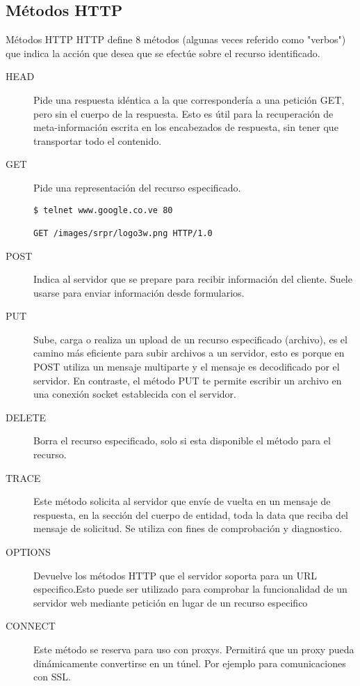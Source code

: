 \subsection{Métodos HTTP} %


\begin{frame}{Métodos HTTP} %
    HTTP define 8 métodos (algunas veces referido como "verbos") que indica la acción que desea que se efectúe sobre el recurso identificado.

    \begin{description}
        \item[HEAD] 
        Pide una respuesta idéntica a la que correspondería a una petición GET, pero sin el cuerpo de la respuesta. Esto es útil para la recuperación de meta-información escrita en los encabezados de respuesta, sin tener que transportar todo el contenido.
        \item[GET]
        Pide una representación del recurso especificado.
        \begin{verbatim}
$ telnet www.google.co.ve 80

GET /images/srpr/logo3w.png HTTP/1.0

        \end{verbatim}
        \item[POST] Indica al servidor que se prepare para recibir información del cliente. Suele usarse para enviar información desde formularios.
        \item[PUT] Sube, carga o realiza un upload de un recurso especificado (archivo), es el camino más eficiente para subir archivos a un servidor, esto es porque en POST utiliza un mensaje multiparte y el mensaje es decodificado por el servidor. En contraste, el método PUT te permite escribir un archivo en una conexión socket establecida con el servidor.
        \item[DELETE] Borra el recurso especificado, solo si esta disponible el
        método para el recurso.
        \item[TRACE] Este método solicita al servidor que envíe de vuelta en un
        mensaje de respuesta, en la sección del cuerpo de entidad, toda la data
        que reciba del mensaje de solicitud. Se utiliza con fines de comprobación y diagnostico.
        \item[OPTIONS] Devuelve los métodos HTTP que el servidor soporta para un URL especifico.Esto puede ser utilizado para comprobar la funcionalidad de un servidor web mediante petición en lugar de un recurso especifico
        \item[CONNECT] Este método se reserva para uso con proxys. Permitirá que un proxy pueda dinámicamente convertirse en un túnel. Por ejemplo para comunicaciones con SSL.
    \end{description}

\end{frame}

